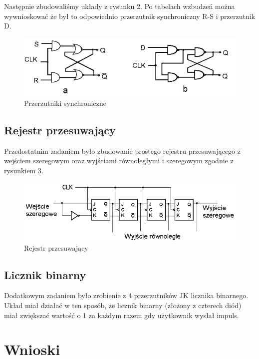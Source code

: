 \documentclass[a4paper,11pt]{article}
\begin{document}
Następnie zbudowaliśmy układy z rysunku 2. Po tabelach wzbudzeń można wywnioskować że był to odpowiednio przerzutnik synchroniczny R-S i przerzutnik D.

\begin{figure}[ht]
 \begin{center}
  \includegraphics[width=12cm]{screenshot134}
 \end{center}
 \caption{Przerzutniki synchroniczne}
\end{figure}

\subsection{Rejestr przesuwający}
Przedostatnim zadaniem było zbudowanie prostego rejestru przesuwającego z wejściem szeregowym oraz wyjściami równoległymi i szeregowym zgodnie z rysunkiem 3.

\begin{figure}[ht]
 \begin{center}
  \includegraphics[width=12cm]{screenshot133}
 \end{center}
 \caption{Rejestr przesuwający}
\end{figure}

\subsection{Licznik binarny}
Dodatkowym zadaniem było zrobienie z 4 przerzutników JK licznika binarnego. Układ miał działać w ten sposób, że licznik binarny (złożony z czterech diód) miał zwiększać wartość o 1 za każdym razem gdy użytkownik wysłał impuls.



\section{Wnioski}
\end{document}
